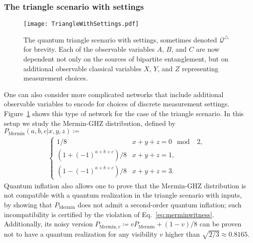 \documentclass[superscriptaddress,aps,prx,nofootinbib,twocolumn,twoside,reprint,letterpaper,longbibliography]{revtex4-2}
\renewcommand{\triangle}{\bigtriangleup}
\begin{document}
\subsubsection{The triangle scenario with settings}\label{sec:Mermin}
\begin{figure}[t]
  \centering
  \texttt{[image: TriangleWithSettings.pdf]}
  \caption{The quantum triangle scenario with settings, sometimes denoted $\mathcal{Q}^{\triangle}$ for brevity.  Each of the observable variables $A$, $B$, and $C$ are now dependent not only on the sources of bipartite entanglement, but on additional observable classical variables $X$, $Y$, and $Z$ representing measurement choices.}
  \label{fig:TriangleWithSettings}
\end{figure}
One can also consider more complicated networks that include additional observable variables to encode for choices of discrete measurement settings.
Figure~\ref{fig:TriangleWithSettings} shows this type of network for the case of the triangle scenario.
In this setup we study the Mermin-GHZ distribution, defined by $P_{\text{Mermin}}(a,b,c|x,y,z)\coloneqq$
\begin{align}\label{eq:MerminBox}
    \begin{cases}
        1/8                            & x+y+z=0 {\mod{}} \;\; 2,\\
        \left(1+(-1)^{a+b+c}\right) /8 & x+y+z=1, \\
        \left(1-(-1)^{a+b+c}\right) /8 & x+y+z=3.
  \end{cases}
\end{align}
Quantum inflation also allows one to prove that the Mermin-GHZ distribution is not compatible with a quantum realization in the triangle scenario with inputs, by showing that $P_\text{Mermin}$ does not admit a second-order quantum inflation; such incompatibility is certified by the violation of Eq.~\eqref{eq:merminwitness}.
Additionally, its noisy version $P_{\text{Mermin},v}\coloneqq v P_\text{Mermin}+(1-v)/8$ can be proven not to have a quantum realization for any visibility $v$ higher than $\sqrt{2/3}\approx 0.8165$.
\end{document}
